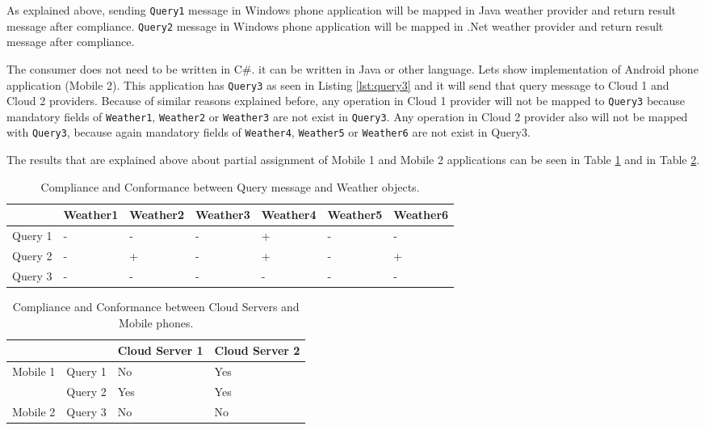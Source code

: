 As explained above, sending {\tt Query1} message in Windows phone application will be mapped in Java weather provider and return result message after compliance. {\tt Query2} message in Windows phone application will be mapped in .Net weather provider and return result message after compliance.

The consumer does not need to be written in C\#. it can be written in Java or other language. Lets show implementation of Android phone application (Mobile 2).  This application has {\tt Query3} as seen in Listing \ref{lst:query3} and it will send that query message to Cloud 1 and Cloud 2 providers. Because of similar reasons explained before, any operation in Cloud 1 provider will not be mapped to {\tt Query3} because mandatory fields of {\tt Weather1}, {\tt Weather2} or {\tt Weather3} are not exist in {\tt Query3}. Any operation in Cloud 2 provider also will not be mapped with {\tt Query3}, because again mandatory fields of {\tt Weather4}, {\tt Weather5} or {\tt Weather6} are not exist in Query3.

The results that are explained above about partial assignment of Mobile 1 and Mobile 2 applications can be seen in Table \ref{tab:resultss} and in Table \ref{tab:resultss2}.

\begin{table}
\centering
\begin{tabular}{ p{2.00cm} p{2.00cm} p{2.00cm} p{2.00cm} p{2.00cm} p{2.00cm} p{2.00cm}}
\toprule
\multicolumn{1}{l}{}&{\textbf{Weather1}} & \textbf{Weather2} & \textbf{Weather3} & \textbf{Weather4} & \textbf{Weather5} & \textbf{Weather6} \\
\midrule
Query 1 & - & - & - & + & - & -\\
\rowcolor{Gray}
Query 2 & - & + & - & + & - & +\\
Query 3 & - & - & - & - & - & -\\
\bottomrule
\end{tabular}
\caption[Compliance and Conformance between Query message and Weather objects .]{Compliance and Conformance between Query message and Weather objects.}
\label{tab:resultss}
\end{table}

\begin{table}
\centering
\begin{tabular}{ p{2.50cm} p{2.50cm} p{2.50cm} p{2.50cm}}
\toprule
\multicolumn{1}{l}{}&{} & \textbf{Cloud Server 1} & \textbf{Cloud Server 2} \\
\midrule
Mobile 1 & Query 1 & No  & Yes\\
         & Query 2 & Yes & Yes\\
\rowcolor{Gray}
Mobile 2 & Query 3 & No  & No\\
\bottomrule
\end{tabular}
\caption[Compliance and Conformance between Cloud Servers and Mobile phones.]{Compliance and Conformance between Cloud Servers and Mobile phones.}
\label{tab:resultss2}
\end{table}

